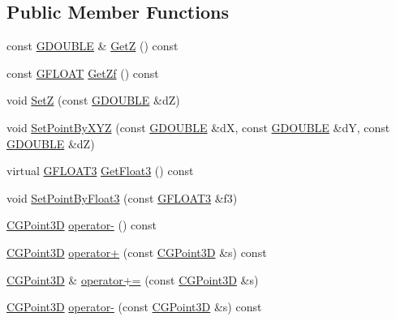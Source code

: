 \subsection*{Public Member Functions}
\begin{DoxyCompactItemize}
\item 
const \hyperlink{_g_types_8h_afd05ac85f90ee8e2a733928545462cd4}{G\+D\+O\+U\+B\+L\+E} \& \hyperlink{class_c_g_point3_d_abe6ec203080fa81f5d557873c16aa09d}{Get\+Z} () const 
\item 
const \hyperlink{_g_types_8h_abf6eba8223df62f199b811a6c52ff2ef}{G\+F\+L\+O\+A\+T} \hyperlink{class_c_g_point3_d_af947236647c21d19d5c05fc0b8c8b042}{Get\+Zf} () const 
\item 
void \hyperlink{class_c_g_point3_d_ab9e1fba7679a799dc9660ff3bef4720b}{Set\+Z} (const \hyperlink{_g_types_8h_afd05ac85f90ee8e2a733928545462cd4}{G\+D\+O\+U\+B\+L\+E} \&d\+Z)
\item 
void \hyperlink{class_c_g_point3_d_a062a7a2a45961b06b3cc477df9d0f209}{Set\+Point\+By\+X\+Y\+Z} (const \hyperlink{_g_types_8h_afd05ac85f90ee8e2a733928545462cd4}{G\+D\+O\+U\+B\+L\+E} \&d\+X, const \hyperlink{_g_types_8h_afd05ac85f90ee8e2a733928545462cd4}{G\+D\+O\+U\+B\+L\+E} \&d\+Y, const \hyperlink{_g_types_8h_afd05ac85f90ee8e2a733928545462cd4}{G\+D\+O\+U\+B\+L\+E} \&d\+Z)
\item 
virtual \hyperlink{_g_types_8h_a7f35886af6bc3271b59984611c1028fb}{G\+F\+L\+O\+A\+T3} \hyperlink{class_c_g_point3_d_a955df751bd86c02e24f7fe40bbcd5c3f}{Get\+Float3} () const 
\item 
void \hyperlink{class_c_g_point3_d_a8aeeaaf2337c08e1786458d8df25268b}{Set\+Point\+By\+Float3} (const \hyperlink{_g_types_8h_a7f35886af6bc3271b59984611c1028fb}{G\+F\+L\+O\+A\+T3} \&f3)
\item 
\hyperlink{class_c_g_point3_d}{C\+G\+Point3\+D} \hyperlink{class_c_g_point3_d_a56315d56a93c528561df140a8ccac6b0}{operator-\/} () const 
\item 
\hyperlink{class_c_g_point3_d}{C\+G\+Point3\+D} \hyperlink{class_c_g_point3_d_af4002cdc86764ad750b37f28c059a659}{operator+} (const \hyperlink{class_c_g_point3_d}{C\+G\+Point3\+D} \&s) const 
\item 
\hyperlink{class_c_g_point3_d}{C\+G\+Point3\+D} \& \hyperlink{class_c_g_point3_d_a287cf8147202c7af29ef4f89385a2126}{operator+=} (const \hyperlink{class_c_g_point3_d}{C\+G\+Point3\+D} \&s)
\item 
\hyperlink{class_c_g_point3_d}{C\+G\+Point3\+D} \hyperlink{class_c_g_point3_d_a8f4add821e6509b0ac1e734f597cf01d}{operator-\/} (const \hyperlink{class_c_g_point3_d}{C\+G\+Point3\+D} \&s) const 

\end{DoxyCompactItemize}
